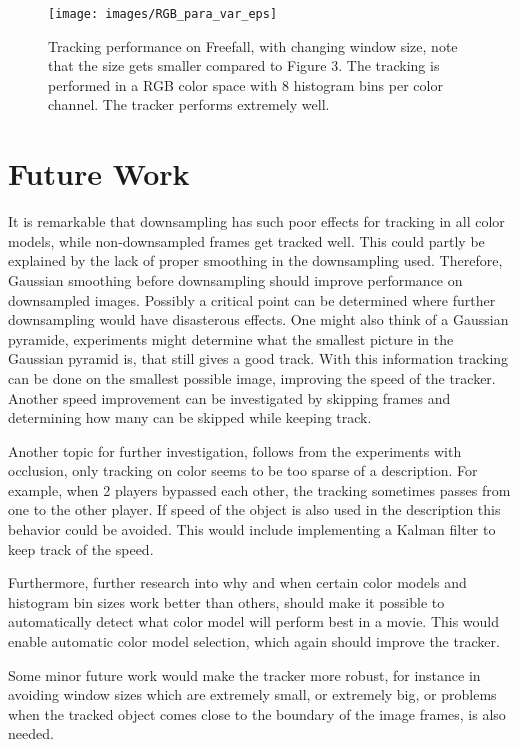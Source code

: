 \documentclass[a4paper,11pt]{article}
\begin{document}
\begin{figure}[!ht]
\label{fig:para_var}
\centering
\texttt{[image: images/RGB\_para\_var\_eps]}
\caption{Tracking performance on Freefall, with changing window size, note that the size gets smaller compared to Figure 3. The tracking is performed in a RGB color space with 8 histogram bins per color channel. The tracker performs extremely well.}
\end{figure}

\section{Future Work} \label{sec:fut}
It is remarkable that downsampling has such poor effects for tracking in all color models, while non-downsampled frames get tracked well. This could partly be explained by the lack of proper smoothing in the downsampling used. Therefore, Gaussian smoothing before downsampling should improve performance on downsampled images. Possibly a critical point can be determined where further downsampling would have disasterous effects. One might also think of a Gaussian pyramide, experiments might determine what the smallest picture in the Gaussian pyramid is, that still gives a good track. With this information tracking can be done on the smallest possible image, improving the speed of the tracker. Another speed improvement can be investigated by skipping frames and determining how many can be skipped while keeping track.
 
Another topic for further investigation, follows from the experiments with occlusion, only tracking on color seems to be too sparse of a description. For example, when 2 players bypassed each other, the tracking sometimes passes from one to the other player. If speed of the object is also used in the description this behavior could be avoided. This would include implementing a Kalman filter to keep track of the speed. 

Furthermore, further research into why and when certain color models and histogram bin sizes work better than others, should make it possible to automatically detect what color model will perform best in a movie. This would enable automatic color model selection, which again should improve the tracker.

Some minor future work would make the tracker more robust, for instance in avoiding window sizes which are extremely small, or extremely big, or problems when the tracked object comes close to the boundary of the image frames, is also needed.
\end{document}
